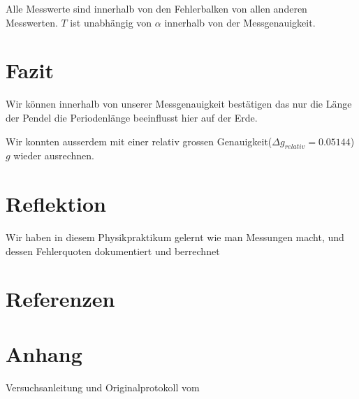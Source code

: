 \documentclass[12pt, a4paper, twoside]{article}
\begin{document}
Alle Messwerte sind innerhalb von den Fehlerbalken von allen anderen Messwerten.
$T$ ist unabhängig von $\alpha$ innerhalb von der Messgenauigkeit.
\section{Fazit}
Wir können innerhalb von unserer Messgenauigkeit bestätigen das nur die Länge der Pendel die Periodenlänge beeinflusst hier auf der Erde.
\par
Wir konnten ausserdem mit einer relativ grossen Genauigkeit($\Delta g_{relativ} = 0.05144$) $g$ wieder ausrechnen.


\section{Reflektion}
Wir haben in diesem Physikpraktikum gelernt wie man Messungen macht, und dessen Fehlerquoten dokumentiert und berrechnet
\section{Referenzen}
\section{Anhang}
Versuchsanleitung und Originalprotokoll vom \labdate
\end{document}
